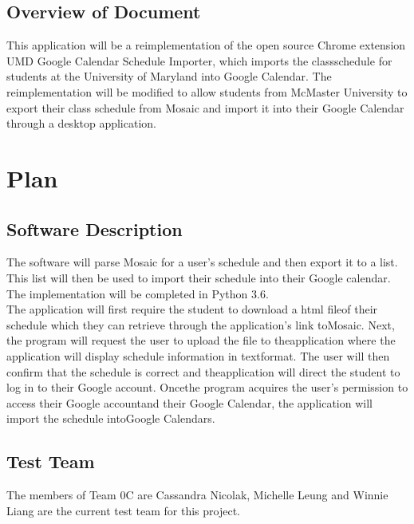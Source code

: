 \documentclass[12pt, titlepage]{article}
\begin{document}
\newpage
\subsection{Overview of Document}
\color{blue}
\hspace{5mm}This application will be a reimplementation of the open source Chrome extension UMD Google Calendar Schedule Importer, which imports the classschedule for students at the University of Maryland into Google Calendar. The reimplementation will be modified to allow students from McMaster University to export their class schedule from Mosaic and import it into their Google Calendar through a desktop application.
\color{black}

\section{Plan}
	
\subsection{Software Description}
\hspace{5mm}
The software will parse Mosaic for a user's schedule and then export it to a list. This list will then be used to import their schedule into their Google calendar. The implementation will be completed in Python 3.6.\\


\color{blue}
The  application  will  first  require  the  student  to  download  a  html  fileof  their  schedule  which  they  can  retrieve  through  the  application’s  link  toMosaic.   Next,  the  program  will  request  the  user  to  upload  the  file  to  theapplication where the application will display schedule information in textformat.   The  user  will  then  confirm  that  the  schedule  is  correct  and  theapplication will direct the student to log in to their Google account.  Oncethe program acquires the user’s permission to access their Google accountand  their  Google  Calendar,  the  application  will  import  the  schedule  intoGoogle Calendars.
\color{black}

\subsection{Test Team}
\hspace{5mm}
The members of Team 0C are Cassandra Nicolak, Michelle Leung and Winnie Liang are the current test team for this project. \\
\end{document}

